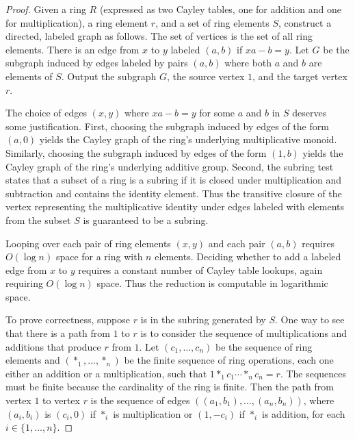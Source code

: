 \begin{proof}
  Given a ring $R$ (expressed as two Cayley tables, one for addition and one for multiplication), a ring element $r$, and a set of ring elements $S$, construct a directed, labeled graph as follows.
  The set of vertices is the set of all ring elements.
  There is an edge from $x$ to $y$ labeled $(a, b)$ if $x a - b = y$.
  Let $G$ be the subgraph induced by edges labeled by pairs $(a, b)$ where both $a$ and $b$ are elements of $S$.
  Output the subgraph $G$, the source vertex $1$, and the target vertex $r$.

  The choice of edges $(x, y)$ where $x a - b = y$ for some $a$ and $b$ in $S$ deserves some justification.
  First, choosing the subgraph induced by edges of the form $(a, 0)$ yields the Cayley graph of the ring's underlying multiplicative monoid.
  Similarly, choosing the subgraph induced by edges of the form $(1, b)$ yields the Cayley graph of the ring's underlying additive group.
  Second, the subring test states that a subset of a ring is a subring if it is closed under multiplication and subtraction and contains the identity element.
  Thus the transitive closure of the vertex representing the multiplicative identity under edges labeled with elements from the subset $S$ is guaranteed to be a subring.

  Looping over each pair of ring elements $(x, y)$ and each pair $(a, b)$ requires $O(\log n)$ space for a ring with $n$ elements.
  Deciding whether to add a labeled edge from $x$ to $y$ requires a constant number of Cayley table lookups, again requiring $O(\log n)$ space.
  Thus the reduction is computable in logarithmic space.

  To prove correctness, suppose $r$ is in the subring generated by $S$.
  One way to see that there is a path from $1$ to $r$ is to consider the sequence of multiplications and additions that produce $r$ from $1$.
  Let $(c_1, \dotsc, c_n)$ be the sequence of ring elements and $(\ast_1, \dotsc, \ast_n)$ be the finite sequence of ring operations, each one either an addition or a multiplication, such that $1 \ast_1 c_1 \dotsb \ast_n c_n = r$.
  The sequences must be finite because the cardinality of the ring is finite.
  Then the path from vertex $1$ to vertex $r$ is the sequence of edges $((a_1, b_1), \dotsc, (a_n, b_n))$, where $(a_i, b_i)$ is $(c_i, 0)$ if $\ast_i$ is multiplication or $(1, -c_i)$ if $\ast_i$ is addition, for each $i \in \{1, \dotsc, n\}$.


\end{proof}
